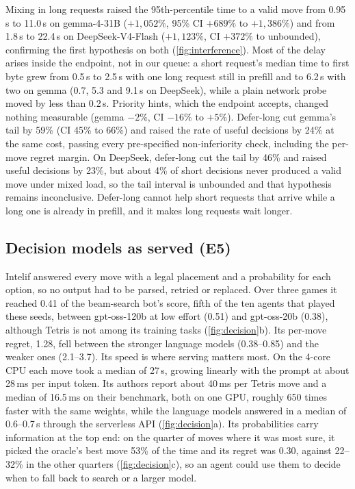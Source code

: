 \documentclass{article}
\begin{document}
Mixing in long requests raised the 95th-percentile time to a valid move from 0.95\,s to 11.0\,s on gemma-4-31B ($+1{,}052\%$, 95\% CI $+689\%$ to $+1{,}386\%$) and from 1.8\,s to 22.4\,s on DeepSeek-V4-Flash ($+1{,}123\%$, CI $+372\%$ to unbounded), confirming the first hypothesis on both (\cref{fig:interference}). Most of the delay arises inside the endpoint, not in our queue: a short request's median time to first byte grew from 0.5\,s to 2.5\,s with one long request still in prefill and to 6.2\,s with two on gemma (0.7, 5.3 and 9.1\,s on DeepSeek), while a plain network probe moved by less than 0.2\,s. Priority hints, which the endpoint accepts, changed nothing measurable (gemma $-2\%$, CI $-16\%$ to $+5\%$). Defer-long cut gemma's tail by 59\% (CI 45\% to 66\%) and raised the rate of useful decisions by 24\% at the same cost, passing every pre-specified non-inferiority check, including the per-move regret margin. On DeepSeek, defer-long cut the tail by 46\% and raised useful decisions by 23\%, but about 4\% of short decisions never produced a valid move under mixed load, so the tail interval is unbounded and that hypothesis remains inconclusive. Defer-long cannot help short requests that arrive while a long one is already in prefill, and it makes long requests wait longer.

\subsection{Decision models as served (E5)}

Intelif answered every move with a legal placement and a probability for each option, so no output had to be parsed, retried or replaced. Over three games it reached 0.41 of the beam-search bot's score, fifth of the ten agents that played these seeds, between gpt-oss-120b at low effort (0.51) and gpt-oss-20b (0.38), although Tetris is not among its training tasks (\cref{fig:decision}b). Its per-move regret, 1.28, fell between the stronger language models (0.38--0.85) and the weaker ones (2.1--3.7). Its speed is where serving matters most. On the 4-core CPU each move took a median of 27\,s, growing linearly with the prompt at about 28\,ms per input token. Its authors report about 40\,ms per Tetris move and a median of 16.5\,ms on their benchmark, both on one GPU, roughly 650 times faster with the same weights, while the language models answered in a median of 0.6--0.7\,s through the serverless API (\cref{fig:decision}a). Its probabilities carry information at the top end: on the quarter of moves where it was most sure, it picked the oracle's best move 53\% of the time and its regret was 0.30, against 22--32\% in the other quarters (\cref{fig:decision}c), so an agent could use them to decide when to fall back to search or a larger model.
\end{document}
